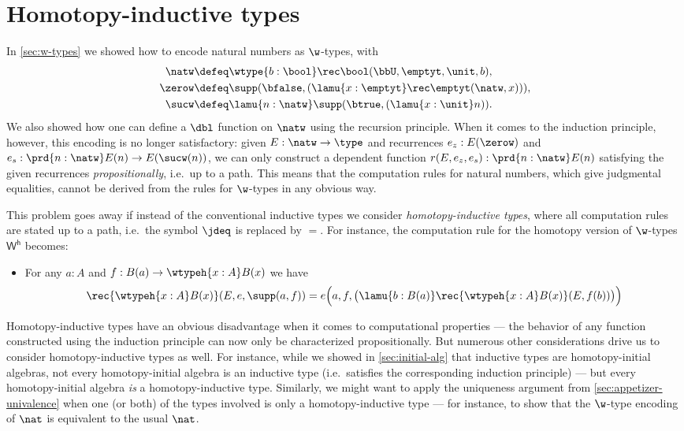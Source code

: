 
\section{Homotopy-inductive types}
\label{sec:htpy-inductive}

In \cref{sec:w-types} we showed how to encode natural numbers as $\w$-types, with
\begin{align*}
\natw & \defeq \wtype{b:\bool} \rec\bool(\bbU,\emptyt,\unit,b), \\
\zerow & \defeq \supp(\bfalse, (\lamu{x:\emptyt} \rec\emptyt(\natw,x))), \\
\sucw & \defeq \lamu{n:\natw} \supp(\btrue, (\lamu{x:\unit} n)).
\end{align*}
We also showed how one can define a $\dbl$ function on $\natw$ using the recursion principle.
When it comes to the induction principle, however, this encoding is no longer satisfactory: given $E : \natw \to \type$ and recurrences $e_z : E(\zerow)$ and $e_s : \prd{n : \natw}  E(n) \to E(\sucw(n))$, we can only construct a dependent function $r(E,e_z,e_s) : \prd{n : \natw} E(n)$ satisfying the given recurrences \emph{propositionally}, i.e.\ up to a path.
This means that the computation rules for natural numbers, which give judgmental equalities, cannot be derived from the rules for $\w$-types in any obvious way.

%
%
This problem goes away if instead of the conventional inductive types we consider \emph{homotopy-inductive types}, where all computation rules are stated up to a path, i.e.\ the symbol $\jdeq$ is replaced by $=$. For instance, the computation rule for the homotopy version of $\w$-types $\mathsf{W^h}$ becomes:
%
\begin{itemize}
\item For any $a : A$ and $f : B(a) \to \wtypeh{x:A} B(x)$ we have
\begin{equation*}
  \rec{\wtypeh{x:A} B(x)}(E,e,\supp(a,f)) = e\Big(a,f,\big(\lamu{b:B(a)} \rec{\wtypeh{x:A} B(x)}(E,f(b))\big)\Big)
\end{equation*}
\end{itemize}

Homotopy-inductive types have an obvious disadvantage when it comes to computational properties --- the behavior of any function constructed using the induction principle can now only be characterized propositionally.
But numerous other considerations drive us to consider homotopy-inductive types as well.
For instance, while we showed in \cref{sec:initial-alg} that inductive types are homotopy-initial algebras, not every homotopy-initial algebra is an inductive type (i.e.\ satisfies the corresponding induction principle) --- but every homotopy-initial algebra \emph{is} a homotopy-inductive type.
Similarly, we might want to apply the uniqueness argument from \cref{sec:appetizer-univalence} when one (or both) of the types involved is only a homotopy-inductive type --- for instance, to show that the $\w$-type encoding of $\nat$ is equivalent to the usual $\nat$.

